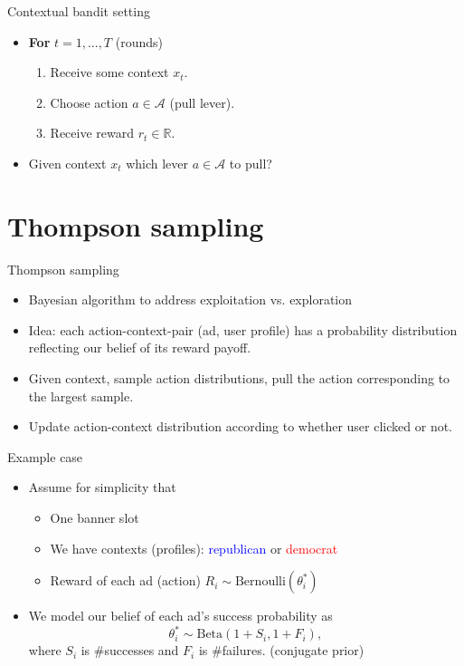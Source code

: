 \documentclass{beamer}
\begin{document}
\begin{frame}{Contextual bandit setting}
  \begin{itemize}
    \item[]
      \textbf{For} $t = 1, ..., T$ (rounds)
      \begin{enumerate}
        \item{Receive some context $x_t$.}
        \item{Choose action  $a \in \mathcal{A}$ (pull lever).}
        \item{Receive reward $r_t \in \mathbb{R}$.}
      \end{enumerate}
    \item{Given context $x_t$ which lever $a \in \mathcal{A}$ to pull?}
  \end{itemize}
\end{frame}

\section{Thompson sampling}
\frame{\sectionpage}

\begin{frame}{Thompson sampling}
  \begin{itemize}
    \item{Bayesian algorithm to address exploitation vs. exploration}
    \item{Idea: each action-context-pair (ad, user profile) has a probability
      distribution reflecting our belief of its reward payoff.}
    \item{Given context, sample action distributions, pull the action
      corresponding to the largest sample.}
    \item{Update action-context distribution according to whether user clicked
      or not.}
  \end{itemize}
\end{frame}

\begin{frame}{Example case}
  \begin{itemize}
    \item{Assume for simplicity that
        \begin{itemize}
          \item{One banner slot}
          \item{We have contexts (profiles): \textcolor{blue}{republican} or
            \textcolor{red}{democrat}}
          \item{Reward of each ad (action) $R_i \sim
            \mathrm{Bernoulli}(\theta_i^*)$}
        \end{itemize}
      }
    \item{We model our belief of each ad's success probability as
      $$
        \theta_i^* \sim \mathrm{Beta}(1 + S_i, 1 + F_i),
      $$where $S_i$ is \#successes and $F_i$ is \#failures. (conjugate prior)}
  \end{itemize}
\end{frame}
\end{document}
